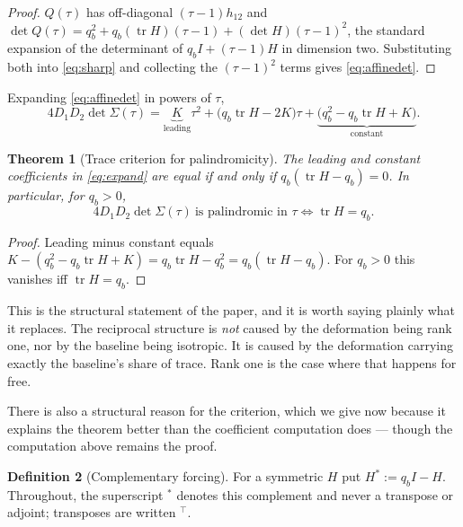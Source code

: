 \documentclass[11pt]{article}
\theoremstyle{plain}
\newtheorem{theorem}{Theorem}
\theoremstyle{definition}
\newtheorem{definition}[theorem]{Definition}
\theoremstyle{remark}
\newcommand{\tr}{\operatorname{tr}}
\newcommand{\Sig}{\Sigma}
\newcommand{\T}{^{\!\top}}
\begin{document}
\begin{proof}
$Q(\tau)$ has off-diagonal $(\tau-1)h_{12}$ and
$\det Q(\tau)=q_b^2+q_b(\tr H)(\tau-1)+(\det H)(\tau-1)^2$, the standard expansion of the
determinant of $q_bI+(\tau-1)H$ in dimension two. Substituting both into \eqref{eq:sharp} and
collecting the $(\tau-1)^2$ terms gives \eqref{eq:affinedet}.
\end{proof}

Expanding \eqref{eq:affinedet} in powers of $\tau$,
\begin{equation}
  4D_1D_2\det\Sig(\tau)
  = \underbrace{K}_{\text{leading}}\tau^2
  + \bigl(q_b\tr H-2K\bigr)\tau
  + \underbrace{\bigl(q_b^2-q_b\tr H+K\bigr)}_{\text{constant}}. \label{eq:expand}
\end{equation}

\begin{theorem}[Trace criterion for palindromicity]\label{thm:trace}
The leading and constant coefficients in \eqref{eq:expand} are equal if and only if
$q_b(\tr H-q_b)=0$. In particular, for $q_b>0$,
\begin{equation}
  4D_1D_2\det\Sig(\tau)\ \text{is palindromic in }\tau
  \iff \tr H=q_b. \label{eq:tracecrit}
\end{equation}
\end{theorem}

\begin{proof}
Leading minus constant equals $K-(q_b^2-q_b\tr H+K)=q_b\tr H-q_b^2=q_b(\tr H-q_b)$. For
$q_b>0$ this vanishes iff $\tr H=q_b$.
\end{proof}

This is the structural statement of the paper, and it is worth saying plainly what it replaces.
The reciprocal structure is \emph{not} caused by the deformation being rank one, nor by the
baseline being isotropic. It is caused by the deformation carrying exactly the baseline's share
of trace. Rank one is the case where that happens for free.

There is also a structural reason for the criterion, which we give now because it explains the
theorem better than the coefficient computation does --- though the computation above remains the
proof.

\begin{definition}[Complementary forcing]\label{def:complement}
For a symmetric $H$ put $H^{*}:=q_bI-H$. Throughout, the superscript ${}^{*}$ denotes this
complement and never a transpose or adjoint; transposes are written ${}\T$.
\end{definition}
\end{document}
